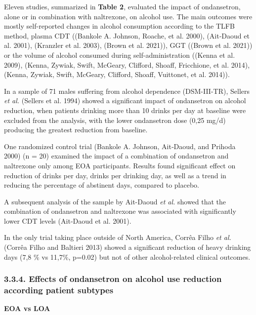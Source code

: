 \documentclass[
  12pt,
]{article}
\begin{document}
Eleven studies, summarized in \textbf{Table 2}, evaluated the impact of
ondansetron, alone or in combination with naltrexone, on alcohol use.
The main outcomes were mostly self-reported changes in alcohol
consumption according to the TLFB method, plasma CDT ((Bankole A.
Johnson, Roache, et al. 2000), (Ait‐Daoud et al. 2001), (Kranzler et al.
2003), (Brown et al. 2021)), GGT ((Brown et al. 2021)) or the volume of
alcohol consumed during self-administration ((Kenna et al. 2009),
(Kenna, Zywiak, Swift, McGeary, Clifford, Shoaff, Fricchione, et al.
2014), (Kenna, Zywiak, Swift, McGeary, Clifford, Shoaff, Vuittonet, et
al. 2014)).

In a sample of 71 males suffering from alcohol dependence (DSM-III-TR),
Sellers \emph{et al.} (Sellers et al. 1994) showed a significant impact
of ondansetron on alcohol reduction, when patients drinking more than 10
drinks per day at baseline were excluded from the analysis, with the
lower ondansetron dose (0,25 mg/d) producing the greatest reduction from
baseline.

One randomized control trial (Bankole A. Johnson, Ait‐Daoud, and Prihoda
2000) (n = 20) examined the impact of a combination of ondansetron and
naltrexone only among EOA participants. Results found significant effect
on reduction of drinks per day, drinks per drinking day, as well as a
trend in reducing the percentage of abstinent days, compared to placebo.

A subsequent analysis of the sample by Ait-Daoud \emph{et al.} showed
that the combination of ondansetron and naltrexone was associated with
significantly lower CDT levels (Ait‐Daoud et al. 2001).

In the only trial taking place outside of North America, Corrêa Filho
\emph{et al.} (Corrêa Filho and Baltieri 2013) showed a significant
reduction of heavy drinking days (7,8 \% vs 11,7\%, p=0.02) but not of
other alcohol-related clinical outcomes.

\subsubsection{3.3.4. Effects of ondansetron on alcohol use reduction
according patient
subtypes}\label{effects-of-ondansetron-on-alcohol-use-reduction-according-patient-subtypes}

\textbf{EOA vs LOA}
\end{document}
